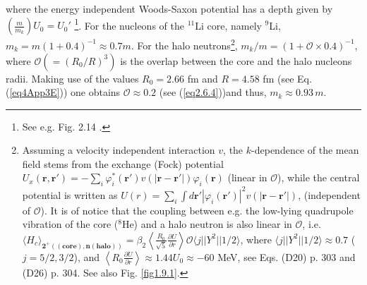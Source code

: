 where the energy independent Woods-Saxon potential has a depth given by\\\mbox{$\left(\frac{m}{m_k}\right)U_0=U_0'$} \footnote{See e.g. Fig. 2.14 \cite{Mahaux:85}.}. For the nucleons of the $^{11}$Li core, namely $^9$Li, $m_k=m(1+0.4)^{-1}\approx 0.7 m$. For the halo neutrons\footnote{\label{f117}Assuming a velocity independent interaction $v$, the $k$-dependence of the mean field stems from the exchange (Fock)  potential $U_x(\mathbf r, \mathbf r')=-\sum_i\varphi^*_i(\mathbf r')v(|\mathbf r-\mathbf r'|)\varphi_i(\mathbf r)$ (linear in $\mathcal O$), while the central potential is written as $U(r)=\sum_i\int d\mathbf r' |\varphi_i(\mathbf r')|^2v(|\mathbf r- \mathbf r'|)$, (independent of $\mathcal O$). It is of notice that the coupling between e.g. the low-lying  quadrupole vibration of the core ($^8$He) and a halo neutron is also linear in $\mathcal O$, i.e. $\langle H_c\rangle_{\pmb{2^+((\text{core}),n (\text{halo}))}}=\beta_2\left\langle\frac{R_0}{\sqrt{5}}\frac{\partial U}{\partial r}\right\rangle\mathcal O\langle j||Y^2||1/2\rangle$, where $\langle j||Y^2||1/2\rangle\approx0.7$ ($j=5/2,3/2$), and $\left\langle R_0\frac{\partial U}{\partial r}\right\rangle\approx1.44 U_0\approx -60$ MeV, see \cite{Brink:05} Eqs. (D20) p. 303 and (D26) p. 304. See also Fig. \ref{fig1.9.1}.}, $m_k/m=(1+\mathcal O\times0.4)^{-1}$, where $\mathcal O(=(R_0/R)^3)$ is the overlap between the core and the halo nucleons radii. Making use of the values $R_0=2.66$ fm and $R=4.58$ fm (see Eq. (\ref{eq4App3E}))  one obtains $\mathcal O\approx0.2$ (see (\ref{eq2.6.4}))and thus,  $m_k\approx 0.93 \,m$.
